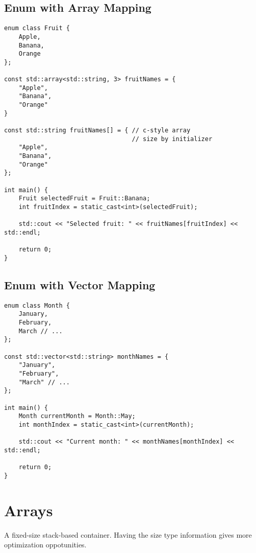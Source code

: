 \documentclass[openany]{report}
\begin{document}
\subsection{Enum with Array Mapping}

\begin{verbatim}
enum class Fruit {
    Apple,
    Banana,
    Orange
};

const std::array<std::string, 3> fruitNames = {
    "Apple",
    "Banana",
    "Orange"
}

const std::string fruitNames[] = { // c-style array
                                   // size by initializer
    "Apple",
    "Banana",
    "Orange"
};

int main() {
    Fruit selectedFruit = Fruit::Banana;
    int fruitIndex = static_cast<int>(selectedFruit);

    std::cout << "Selected fruit: " << fruitNames[fruitIndex] << std::endl;

    return 0;
}
\end{verbatim}

\subsection{Enum with Vector Mapping}

\begin{verbatim}
enum class Month {
    January,
    February,
    March // ...
};

const std::vector<std::string> monthNames = {
    "January",
    "February",
    "March" // ... 
};

int main() {
    Month currentMonth = Month::May;
    int monthIndex = static_cast<int>(currentMonth);

    std::cout << "Current month: " << monthNames[monthIndex] << std::endl;

    return 0;
}
\end{verbatim}


\section{Arrays}

A fixed-size stack-based container. Having the size type information gives more optimization oppotunities.
\end{document}
